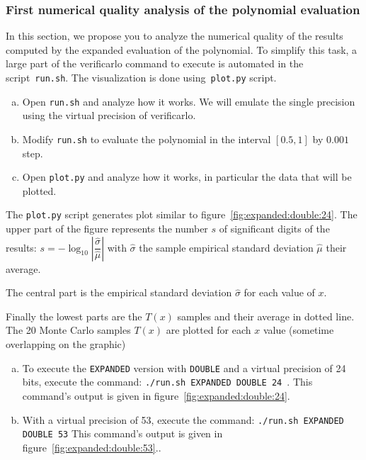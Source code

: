\documentclass{TP}
\begin{document}
\subsubsection{First numerical quality analysis of the polynomial evaluation}

In this section, we propose you to analyze the numerical quality of the results computed by the expanded evaluation of the polynomial. To simplify this task, a large part of the verificarlo command to execute is automated in the script~\texttt{run.sh}. The visualization is done using~\texttt{plot.py} script.






\begin{question}
  \begin{enumerate}[(a)]
 \item Open {\tt run.sh} and analyze how it works. We will emulate the single precision using the virtual precision of verificarlo.
  \item Modify {\tt run.sh} to evaluate the polynomial in the interval $[0.5,1]$ by $0.001$ step.
  \item Open {\tt plot.py} and analyze how it works, in particular the data that will be plotted.
  \end{enumerate}
\end{question}









The \texttt{plot.py} script generates plot similar to
figure~\ref{fig:expanded:double:24}.
The upper part of the figure represents the number $s$ of significant digits of the results: $s=-\log_{10}\left|\dfrac{\hat\sigma}{\hat\mu}\right|$ with $\hat\sigma$ the sample empirical standard deviation  $\hat\mu$ their average.


The central part is the empirical standard deviation $\hat\sigma$ for each value of $x$.

Finally the lowest parts are the $T(x)$ samples and their average in dotted line. The 20 Monte Carlo samples $T(x)$ are plotted for each $x$ value (sometime overlapping on the graphic)

\begin{question}
\begin{enumerate}[(a)]
\item To execute the {\tt EXPANDED} version with {\tt DOUBLE} and a virtual precision of 24 bits, execute the command: {\tt ./run.sh EXPANDED
      DOUBLE 24 }. \newline This command's output is given in figure~\ref{fig:expanded:double:24}.
  \item With a virtual precision of 53, execute the command: {\tt ./run.sh EXPANDED DOUBLE 53} \newline
  This command's output is given in figure~\ref{fig:expanded:double:53}..
  \end{enumerate}
\end{question}
\end{document}
